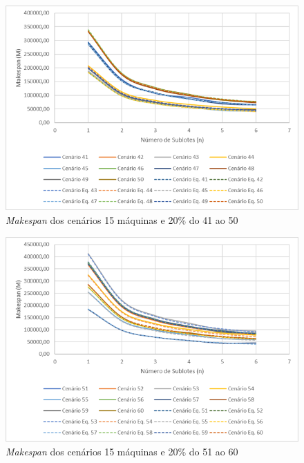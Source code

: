 \begin{figure}[H]
    \centering
     \includegraphics[width=13cm]{Apendices/Figuras/15m20_41-50.png}
     \caption{\textit{Makespan} dos cenários 15 máquinas e 20\% do 41 ao 50}
    \label{fig:15m20_41-50}
\end{figure}

\begin{figure}[H]
    \centering
     \includegraphics[width=13cm]{Apendices/Figuras/15m20_51-60.png}
     \caption{\textit{Makespan} dos cenários 15 máquinas e 20\% do 51 ao 60}
    \label{fig:15m20_51-60}
\end{figure}


